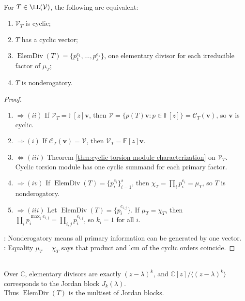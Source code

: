 \begin{theorem} \label{thm:nonderogatory-cyclic-equivalences} \\
For $T\in\LL(\mathcal{V})$, the following are equivalent:
\begin{enumerate}[label=(\roman*)]
\setlength{\itemsep}{0pt}
\item $\mathcal{V}_T$ is cyclic;
\item $T$ has a cyclic vector;
\item $\operatorname{ElemDiv}(T)=\{p_1^{e_1},\ldots,p_s^{e_s}\}$, one elementary divisor for each irreducible factor of $\mu_T$;
\item $T$ is nonderogatory.
\end{enumerate}
\begin{proof}
\begin{enumerate}[label=(\roman*).]
\setlength{\itemsep}{0pt}
\item[$(i)$]$\Rightarrow (ii)$ If $\mathcal{V}_T=\mathbb{F}[z]\mathbf{v}$, then $\mathcal{V}=\{p(T)\mathbf{v}:p\in\mathbb{F}[z]\}=\mathcal{C}_T(\mathbf{v})$, so $\mathbf{v}$ is cyclic.
\item[$(ii)$]$\Rightarrow (i)$ If $\mathcal{C}_T(\mathbf{v})=\mathcal{V}$, then $\mathcal{V}_T=\mathbb{F}[z]\mathbf{v}$.
\item[$(i)$]$\Leftrightarrow (iii)$ Theorem \ref{thm:cyclic-torsion-module-characterization} on $\mathcal{V}_T$. Cyclic torsion module has one cyclic summand for each primary factor.
\item[$(iii)$]$\Rightarrow (iv)$ If $\operatorname{ElemDiv}(T)=\{p_i^{e_i}\}_{i=1}^s$, then $\chi_T=\prod_i p_i^{e_i}=\mu_T$, so $T$ is nonderogatory.
\item[$(iv)$]$\Rightarrow (iii)$ Let $\operatorname{ElemDiv}(T)=\{p_i^{e_{i,j}}\}$. If $\mu_T=\chi_T$, then $\prod_i p_i^{\max_j e_{i,j}}=\prod_{i,j}p_i^{e_{i,j}}$, so $k_i=1$ for all $i$.
\end{enumerate}
: Nonderogatory means all primary information can be generated by one vector.\\
: Equality $\mu_T=\chi_T$ says that product and lcm of the cyclic orders coincide.
\end{proof}
\end{theorem}

\begin{perspective} \label{per:elementary-divisors-and-jordan-blocks} \\
Over $\mathbb{C}$, elementary divisors are exactly $(z-\lambda)^k$, and $\mathbb{C}[z]/\langle(z-\lambda)^k\rangle$ corresponds to the Jordan block $J_k(\lambda)$.\\
Thus $\operatorname{ElemDiv}(T)$ is the multiset of Jordan blocks.
\end{perspective}

